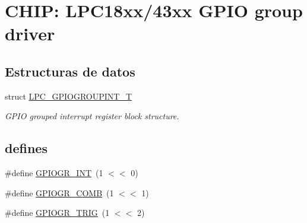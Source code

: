 \hypertarget{group___g_p_i_o_g_p__18_x_x__43_x_x}{}\section{C\+H\+IP\+: L\+P\+C18xx/43xx G\+P\+IO group driver}
\label{group___g_p_i_o_g_p__18_x_x__43_x_x}
\subsection*{Estructuras de datos}
\begin{DoxyCompactItemize}
\item 
struct \hyperlink{struct_l_p_c___g_p_i_o_g_r_o_u_p_i_n_t___t}{L\+P\+C\+\_\+\+G\+P\+I\+O\+G\+R\+O\+U\+P\+I\+N\+T\+\_\+T}
\begin{DoxyCompactList}\small\item\em G\+P\+IO grouped interrupt register block structure. \end{DoxyCompactList}\end{DoxyCompactItemize}
\subsection*{\textquotesingle{}defines\textquotesingle{}}
\begin{DoxyCompactItemize}
\item 
\#define \hyperlink{group___g_p_i_o_g_p__18_x_x__43_x_x_gaf15160a16e7ec36a9046ad41d9b5e85b}{G\+P\+I\+O\+G\+R\+\_\+\+I\+NT}~(1 $<$$<$ 0)
\item 
\#define \hyperlink{group___g_p_i_o_g_p__18_x_x__43_x_x_ga99839b878e80485d41a8ed02c16a9aaf}{G\+P\+I\+O\+G\+R\+\_\+\+C\+O\+MB}~(1 $<$$<$ 1)
\item 
\#define \hyperlink{group___g_p_i_o_g_p__18_x_x__43_x_x_gad93f80c7a388c505b90dd0a8daa2f6b4}{G\+P\+I\+O\+G\+R\+\_\+\+T\+R\+IG}~(1 $<$$<$ 2)
\end{DoxyCompactItemize}
